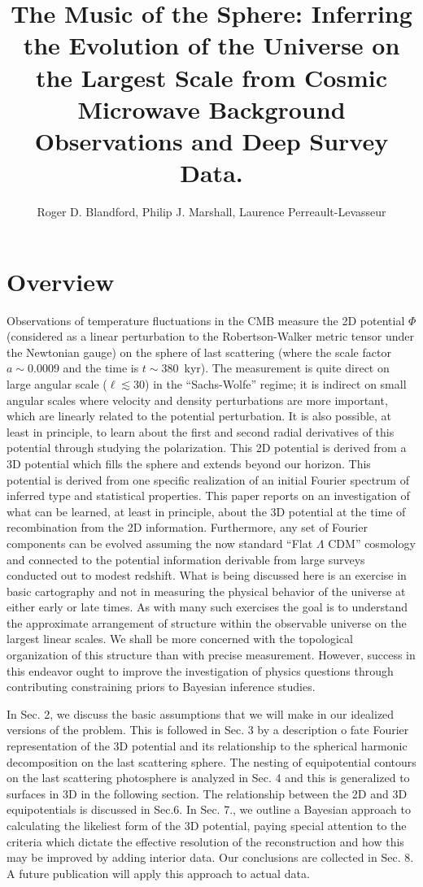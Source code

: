 \documentclass[12pt]{article}
\title{The Music of the Sphere: Inferring the Evolution of the Universe on the Largest Scale from Cosmic Microwave Background Observations and Deep Survey Data.}
\author{Roger D. Blandford, Philip J. Marshall, Laurence Perreault-Levasseur}
\begin{document}
\maketitle

\section{Overview}
Observations of temperature fluctuations in the CMB measure the 2D potential $\Phi$ (considered as a linear perturbation to the Robertson-Walker metric tensor under the Newtonian gauge) on the sphere of last scattering (where the scale factor $a\sim0.0009$ and the time is $t\sim380$~kyr). The measurement is quite direct on large angular scale ($\ell\lesssim30$) in the ``Sachs-Wolfe'' regime; it is indirect on small angular scales where velocity and density perturbations are more important, which are linearly related to the potential perturbation. It is also possible, at least in principle, to learn about the first and second radial derivatives of this potential through studying the polarization. This 2D potential is derived from a 3D potential which fills the sphere and extends beyond our horizon. This potential is derived from one specific realization of an initial Fourier spectrum of inferred type and statistical properties.  This paper reports on an investigation of what can be learned, at least in principle, about the 3D potential at the time of recombination from the 2D information. Furthermore, any set of Fourier components can be evolved assuming the now standard ``Flat $\Lambda$ CDM'' cosmology and connected to the potential information derivable from large surveys conducted out to modest redshift. What is being discussed here is an exercise in basic cartography and not in measuring the physical behavior of the universe at either early or late times. As with many such exercises the goal is to understand the approximate arrangement of structure within the observable universe on the largest linear scales. We shall be more concerned with the topological organization of this structure than with precise measurement. However, success in this endeavor ought to improve the investigation of physics questions through contributing constraining priors to Bayesian inference studies.

In Sec. 2, we discuss the basic assumptions that we will make in our idealized versions of the problem. This is followed in Sec. 3 by a description o fate Fourier representation of the 3D potential and its relationship to the spherical harmonic decomposition on the last scattering sphere. The nesting of equipotential contours on the last scattering photosphere is analyzed in Sec. 4 and this is generalized to surfaces in 3D in the following section.  The relationship between the 2D and 3D equipotentials is discussed in Sec.6. In Sec. 7., we outline a Bayesian approach to calculating the likeliest form of the 3D potential, paying special attention to the criteria which dictate the effective resolution of the reconstruction and how this may be improved by adding interior data. Our conclusions are collected in Sec. 8. A future publication will apply this approach to actual data.
\end{document}
